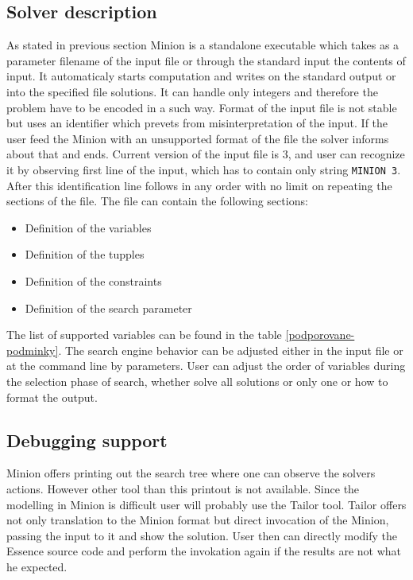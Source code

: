 \subsection{Solver description}
As stated in previous section Minion is a standalone executable which takes as a parameter
filename of the input file or through the standard input the contents of input.
It automaticaly starts computation and writes on the standard output or into the
specified file solutions. It can handle only integers and therefore the problem have to
be encoded in a such way. Format of the input file is not stable but uses an identifier
which prevets from misinterpretation of the input. If the user feed the Minion with 
an unsupported format of the file the solver informs about that and ends. Current version
of the input file is 3, and user can recognize it by observing first line of the input, which
has to contain only string \texttt{MINION 3}. After this identification line follows in any order
with no limit on repeating the sections of the file. The file can contain the following sections:

\begin{itemize}
  \item Definition of the variables
  \item Definition of the tupples
  \item Definition of the constraints
  \item Definition of the search parameter
\end{itemize}

The list of supported variables can be found in the table \ref{podporovane-podminky}.
The search engine behavior can be adjusted either in the input file or at the command line
by parameters. User can adjust the order of variables during the selection phase of search,
whether solve all solutions or only one or how to format the output.
 
\subsection{Debugging support}
Minion offers printing out the search tree where one can observe the solvers actions.
However other tool than this printout is not available. Since the modelling in Minion
is difficult user will probably use the Tailor tool. Tailor offers not only translation
to the Minion format but direct invocation of the Minion, passing the input to it and
show the solution. User then can directly modify the Essence source code and perform
the invokation again if the results are not what he expected. 

